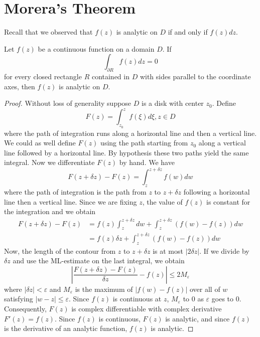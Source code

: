 \section{Morera's Theorem}


Recall that we observed that $f(z)$ is analytic on $D$ if and only if $f(z)dz$.

\begin{theorem} \label{namthm:morera}
    Let $f(z)$ be a continuous function on a domain $D$. If \begin{equation*}
        \int_{\partial R}f(z)dz = 0
    \end{equation*}
    for every closed rectangle $R$ contained in $D$ with sides parallel to the coordinate axes, then $f(z)$ is analytic on $D$.
\end{theorem}
\begin{proof}
    Without loss of generality suppose $D$ is a disk with center $z_0$. Define \begin{equation*}
        F(z) = \int_{z_0}^zf(\xi)d\xi, z \in D
    \end{equation*}
    where the path of integration runs along a horizontal line and then a vertical line. We could as well define $F(z)$ using the path starting from $z_0$ along a vertical line followed by a horizontal line. By hypothesis these two paths yield the same integral. Now we differentiate $F(z)$ by hand. We have \begin{equation*}
        F(z+\delta z) - F(z) = \int_z^{z+\delta z}f(w)dw
    \end{equation*}
    where the path of integration is the path from $z$ to $z+\delta z$ following a horizontal line then a vertical line. Since we are fixing $z$, the value of $f(z)$ is constant for the integration and we obtain \begin{align*}
        F(z+\delta z)-F(z)&= f(z)\int_z^{z+\delta z}dw+\int_z^{z+\delta z}(f(w)-f(z))dw \\
        &= f(z)\delta z + \int_z^{z+\delta z}(f(w)-f(z))dw
    \end{align*}
    Now, the length of the contour from $z$ to $z+\delta z$ is at most $|2\delta z|$. If we divide by $\delta z$ and use the ML-estimate on the last integral, we obtain \begin{equation*}
        \left|\frac{F(z+\delta z)-F(z)}{\delta z} - f(z) \right| \leq 2M_{\varepsilon}
    \end{equation*}
    where $|\delta z| < \varepsilon$ and $M_{\varepsilon}$ is the maximum of $|f(w)-f(z)|$ over all of $w$ satisfying $|w-z| \leq \varepsilon$. Since $f(z)$ is continuous at $z$, $M_{\varepsilon}$ to $0$ as $\varepsilon$ goes to $0$. Consequently, $F(z)$ is complex differentiable with complex derivative $F'(z) = f(z)$. Since $f(z)$ is continuous, $F(z)$ is analytic, and since $f(z)$ is the derivative of an analytic function, $f(z)$ is analytic.
\end{proof}




